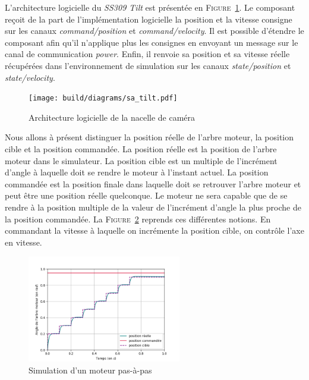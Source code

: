 				L'architecture logicielle du \textit{SS309 Tilt} est présentée en \textsc{Figure}~\ref{fig:sa_tilt}. Le composant reçoit de la part de l'implémentation logicielle la position et la vitesse consigne sur les canaux \textit{command/position} et \textit{command/velocity}. Il est possible d'étendre le composant afin qu'il n'applique plus les consignes en envoyant un message sur le canal de communication \textit{power}. Enfin, il renvoie sa position et sa vitesse réelle récupérées dans l'environnement de simulation sur les canaux \textit{state/position} et \textit{state/velocity}.

				\begin{figure}[!htb]
					\centering
					\texttt{[image: build/diagrams/sa\_tilt.pdf]}
					\caption{Architecture logicielle de la nacelle de caméra}
					\label{fig:sa_tilt}
				\end{figure}

				Nous allons à présent distinguer la position réelle de l'arbre moteur, la position cible et la position commandée. La position réelle est la position de l'arbre moteur dans le simulateur. La position cible est un multiple de l'incrément d'angle à laquelle doit se rendre le moteur à l'instant actuel. La position commandée est la position finale dans laquelle doit se retrouver l'arbre moteur et peut être une position réelle quelconque. Le moteur ne sera capable que de se rendre à la position multiple de la valeur de l'incrément d'angle la plus proche de la position commandée. La \textsc{Figure}~\ref{fig:tilt_position} reprends ces différentes notions. En commandant la vitesse à laquelle on incrémente la position cible, on contrôle l'axe en vitesse.

				\begin{figure}[!htb]
					\centering
					\includegraphics[width=0.6\textwidth]{imgs/stepper_motor.png}
					\caption{Simulation d'un moteur pas-à-pas}
					\label{fig:tilt_position}
				\end{figure}
				
